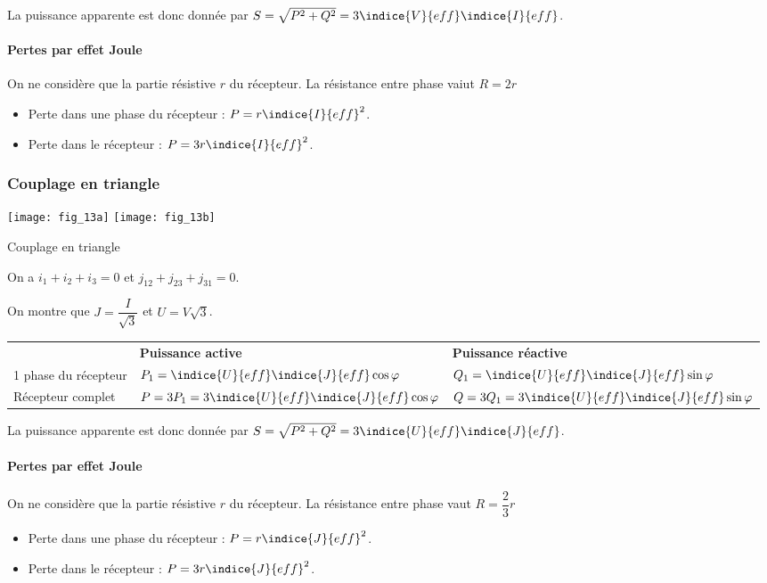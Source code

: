 La puissance apparente est donc donnée par $S = \sqrt{P^2 + Q^2} = 3 \indice{V}{eff}\indice{I}{eff}$.

\paragraph{Pertes par effet Joule}
On ne considère que la partie résistive $r$ du récepteur. La résistance entre phase vaiut $R = 2r$
\begin{itemize}
\item Perte dans une phase du récepteur : $P = r\indice{I}{eff}^2$.
\item Perte dans le récepteur : $P = 3 r\indice{I}{eff}^2$.
\end{itemize}



\subsubsection{Couplage en triangle}


\begin{marginfigure}
\centering
\texttt{[image: fig\_13a]}
\texttt{[image: fig\_13b]}
\caption{Couplage en triangle \label{fig:ge:cours:13}}
\end{marginfigure}

On a  $i_1 + i_2 + i_3 = 0$ et $j_{12}+j_{23}+j_{31}=0$.

On montre que $J = \dfrac{I}{\sqrt{3}}$ et $U = V\sqrt{3}$.
\begin{tabular}{lll}
\hline
& \textbf{Puissance active} & \textbf{Puissance réactive} \\ 
1 phase du récepteur & 
$P_1 = \indice{U}{eff}\indice{J}{eff} \cos \varphi$ &
$Q_1 = \indice{U}{eff}\indice{J}{eff} \sin \varphi$ \\
Récepteur complet & 
$P = 3P_1 =  3\indice{U}{eff}\indice{J}{eff} \cos \varphi$ &
$Q = 3Q_1 = 3 \indice{U}{eff}\indice{J}{eff} \sin \varphi$ \\
\hline
\end{tabular}

La puissance apparente est donc donnée par $S = \sqrt{P^2 + Q^2} = 3 \indice{U}{eff}\indice{J}{eff}$.

\paragraph{Pertes par effet Joule}
On ne considère que la partie résistive $r$ du récepteur. La résistance entre phase vaut $R = \dfrac{2}{3}r$ 
\begin{itemize}
\item Perte dans une phase du récepteur : $P = r\indice{J}{eff}^2$.
\item Perte dans le récepteur : $P = 3 r\indice{J}{eff}^2$.
\end{itemize}



